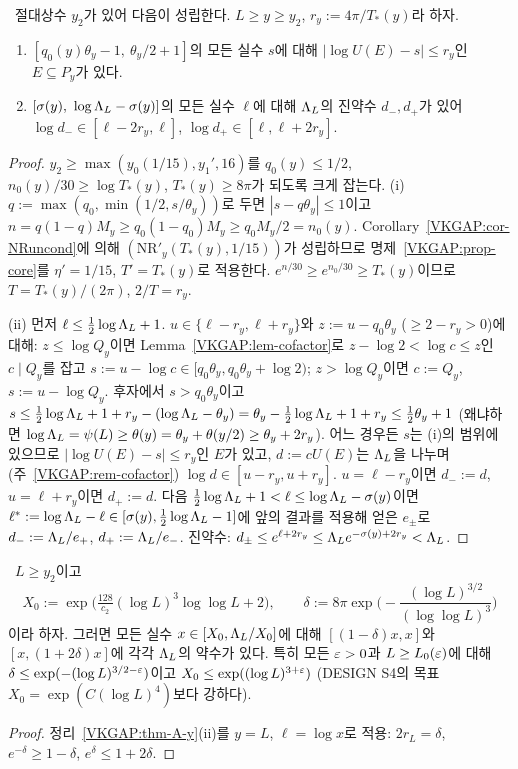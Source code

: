 \begin{theorem}[규모 $y$의 풀에 의한 양쪽 약수 간격]\label{VKGAP:thm-A-y}
\ 절대상수 $y_2$가 있어 다음이 성립한다. $L\ge y\ge y_2$, $r_y:=4\pi/T_*(y)$라 하자.
\begin{enumerate}[label=(\roman*)]
\item $[q_0(y)\theta_y-1,\ \theta_y/2+1]$의 모든 실수 $s$에 대해 $|\log U(E)-s|\le r_y$인 $E\subseteq P_y$가 있다.
\item $[\sigma(y),\ \log\Lam_L-\sigma(y)]$의 모든 실수 $\ell$에 대해 $\Lambda_L$의 진약수 $d_-,d_+$가 있어
$\log d_-\in[\ell-2r_y,\ell]$, $\log d_+\in[\ell,\ell+2r_y]$.
\end{enumerate}
\end{theorem}
\begin{proof}
$y_2\ge\max(y_0(1/15),y_1',16)$를 $q_0(y)\le1/2$, $n_0(y)/30\ge\log T_*(y)$, $T_*(y)\ge 8\pi$가 되도록 크게 잡는다.
(i) $q:=\max(q_0,\min(1/2,s/\theta_y))$로 두면 $|s-q\theta_y|\le1$이고 $n=q(1-q)M_y\ge q_0(1-q_0)M_y\ge q_0M_y/2=n_0(y)$.
Corollary~\ref{VKGAP:cor-NRuncond}에 의해 $(\mathrm{NR}'_y(T_*(y),1/15))$가 성립하므로 명제~\ref{VKGAP:prop-core}를
$\eta'=1/15$, $T'=T_*(y)$로 적용한다. $e^{n/30}\ge e^{n_0/30}\ge T_*(y)$이므로 $T=T_*(y)/(2\pi)$, $2/T=r_y$.

(ii) 먼저 $\ell\le\frac12\log\Lambda_L+1$. $u\in\{\ell-r_y,\ell+r_y\}$와 $z:=u-q_0\theta_y$ ($\ge2-r_y>0$)에 대해:
$z\le\log Q_y$이면 Lemma~\ref{VKGAP:lem-cofactor}로 $z-\log2<\log c\le z$인 $c\mid Q_y$를 잡고 $s:=u-\log c\in[q_0\theta_y,q_0\theta_y+\log2)$;
$z>\log Q_y$이면 $c:=Q_y$, $s:=u-\log Q_y$. 후자에서 $s>q_0\theta_y$이고
$s\le\frac12\log\Lambda_L+1+r_y-(\log\Lambda_L-\theta_y)=\theta_y-\frac12\log\Lambda_L+1+r_y\le\frac12\theta_y+1$
(왜냐하면 $\log\Lambda_L=\psi(L)\ge\theta(y)=\theta_y+\theta(y/2)\ge\theta_y+2r_y$). 어느 경우든 $s$는 (i)의 범위에 있으므로
$|\log U(E)-s|\le r_y$인 $E$가 있고, $d:=cU(E)$는 $\Lambda_L$을 나누며 (주~\ref{VKGAP:rem-cofactor}) $\log d\in[u-r_y,u+r_y]$.
$u=\ell-r_y$이면 $d_-:=d$, $u=\ell+r_y$이면 $d_+:=d$.
다음 $\frac12\log\Lambda_L+1<\ell\le\log\Lambda_L-\sigma(y)$이면 $\ell^*:=\log\Lambda_L-\ell\in[\sigma(y),\frac12\log\Lambda_L-1]$에 앞의 결과를 적용해
얻은 $e_\pm$로 $d_-:=\Lambda_L/e_+$, $d_+:=\Lambda_L/e_-$.
진약수: $d_\pm\le e^{\ell+2r_y}\le\Lambda_Le^{-\sigma(y)+2r_y}<\Lambda_L$.
\end{proof}

\begin{theorem}\label{VKGAP:thm-A}
\
$L\ge y_2$이고
\[
X_0:=\exp\!\Big(\tfrac{128}{c_2}(\log L)^3\log\log L+2\Big),\qquad
\delta:=8\pi\exp\!\Big(-\frac{(\log L)^{3/2}}{(\log\log L)^{3}}\Big)
\]
이라 하자. 그러면 모든 실수 $x\in[X_0,\Lambda_L/X_0]$에 대해 $[(1-\delta)x,x]$와 $[x,(1+2\delta)x]$에 각각 $\Lambda_L$의 약수가 있다.
특히 모든 $\varepsilon>0$과 $L\ge L_0(\varepsilon)$에 대해 $\delta\le\exp(-(\log L)^{3/2-\varepsilon})$이고 $X_0\le\exp((\log L)^{3+\varepsilon})$
(DESIGN S4의 목표 $X_0=\exp(C(\log L)^4)$보다 강하다).
\end{theorem}
\begin{proof}
정리~\ref{VKGAP:thm-A-y}(ii)를 $y=L$, $\ell=\log x$로 적용: $2r_L=\delta$, $e^{-\delta}\ge1-\delta$, $e^{\delta}\le1+2\delta$.
\end{proof}

